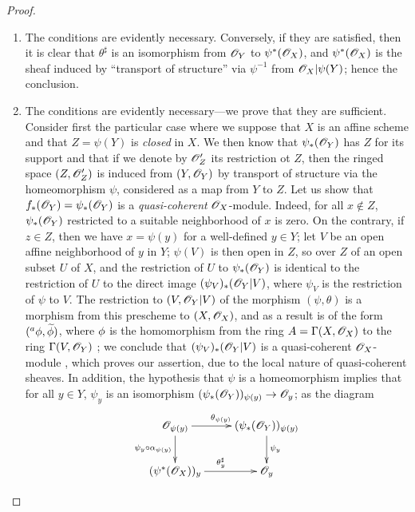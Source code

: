 \begin{proof}
\label{proof-1.4.2.2}
\medskip\noindent
\begin{enumerate}[label=(\alph*)]
  \item The conditions are evidently necessary.
    Conversely, if they are satisfied, then it is clear that $\theta^\sharp$ is an isomorphism from $\mathscr{O}_Y$ to $\psi^*(\mathscr{O}_X)$, and $\psi^*(\mathscr{O}_X)$ is the sheaf induced by ``transport of structure'' via $\psi^{-1}$ from $\mathscr{O}_X|\psi(Y)$; hence the conclusion.
  \item The conditions are evidently necessary---we prove that they are sufficient.
    Consider first the particular case where we suppose that $X$ is an affine scheme and that $Z=\psi(Y)$ is \emph{closed} in $X$.
    We then know  that $\psi_*(\mathscr{O}_Y)$ has $Z$ for its support and that if we denote by $\mathscr{O}_Z'$ its restriction ot $Z$, then the ringed space $(Z,\mathscr{O}_Z')$ is induced from $(Y,\mathscr{O}_Y)$ by transport of structure via the homeomorphism $\psi$, considered as a map from $Y$ to $Z$.
    Let us show that $f_*(\mathscr{O}_Y)=\psi_*(\mathscr{O}_Y)$ is a \emph{quasi-coherent} $\mathscr{O}_X$-module.
    Indeed, for all $x\not\in Z$, $\psi_*(\mathscr{O}_Y)$ restricted to a suitable neighborhood of $x$ is zero.
    On the contrary, if $z\in Z$, then we have $x=\psi(y)$ for a well-defined  $y\in Y$; let $V$ be an open affine neighborhood of $y$ in $Y$; $\psi(V)$ is then open in $Z$, so  over $Z$ of an open subset $U$ of $X$, and the restriction of $U$ to $\psi_*(\mathscr{O}_Y)$ is identical to the restriction of $U$ to the direct image
    $(\psi_V)_*(\mathscr{O}_Y|V)$, where $\psi_V$ is the restriction of $\psi$ to $V$.
    The restriction to $(V,\mathscr{O}_Y|V)$ of the morphism $(\psi,\theta)$ is a morphism from this prescheme to $(X,\mathscr{O}_X)$, and as a result is of the form $({}^a\phi,{\widetilde{\phi}})$, where $\phi$ is the homomorphism from the ring $A=\Gamma(X,\mathscr{O}_X)$ to the ring $\Gamma(V,\mathscr{O}_Y)$ ; we conclude that $(\psi_V)_*(\mathscr{O}_Y|V)$ is a quasi-coherent $\mathscr{O}_X$-module , which proves our assertion, due to the local nature of quasi-coherent sheaves.
    In addition, the hypothesis that $\psi$ is a homeomorphism implies  that for all $y\in Y$, $\psi_y$ is an isomorphism $(\psi_*(\OO_Y))_{\psi(y)}\to\OO_y$; as the diagram
    \[
      \xymatrix{
        \OO_{\psi(y)}\ar[r]^{\theta_{\psi(y)}}\ar[d]_{\psi_y\circ\alpha_{\psi(y)}} &
        (\psi_*(\OO_Y))_{\psi(y)}\ar[d]^{\psi_y}\\
        (\psi^*(\OO_X))_y\ar[r]^{\theta_y^\sharp} &
        \OO_y
}\]
\end{enumerate}
\end{proof}
